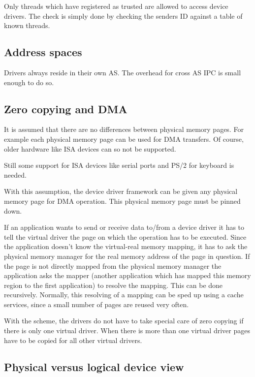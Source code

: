 Only threads which have registered as trusted are allowed to access
device drivers.  The check is simply done by checking the senders
ID against a table of known threads.

\subsection{Address spaces}

Drivers always reside in their own AS. The overhead for cross AS IPC
is small enough to do so.

\subsection{Zero copying and DMA}

It is assumed that there are no differences between physical memory
pages. For example each physical memory page can be used for DMA
transfers. Of course, older hardware like ISA devices can so not be
supported.  

Still some support for ISA devices like serial ports and PS/2 for
keyboard is needed.  
  
With this assumption, the device driver framework can be given any
physical memory page for DMA operation.  This physical memory page
must be pinned down.
  
If an application wants to send or receive data to/from a device
driver it has to tell the virtual driver the page on which the
operation has to be executed.  Since the application doesn't know the
virtual-real memory mapping, it has to ask the physical memory manager
for the real memory address of the page in question.  If the page is
not directly mapped from the physical memory manager the application
asks the mapper (another application which has mapped this memory
region to the first application) to resolve the mapping.  This can be
done recursively.  Normally, this resolving of a mapping can be sped
up using a cache services, since a small number of pages are reused
very often.
  
With the scheme, the drivers do not have to take special care of zero
copying if there is only one virtual driver.  When there is more than
one virtual driver pages have to be copied for all other virtual
drivers.

\subsection{Physical versus logical device view}

